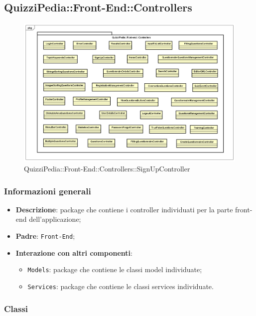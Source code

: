 \newpage
\subsection{QuizziPedia::Front-End::Controllers}


\begin{figure}
	\centering
	\includegraphics[scale=0.45]{UML/Package/QuizziPedia_Front-End_Controllers.png}
	\caption{QuizziPedia::Front-End::Controllers::SignUpController}
\end{figure}

\subsubsection{Informazioni generali}
\begin{itemize}
	\item \textbf{Descrizione}: package che contiene i controller individuati per la parte front-end dell'applicazione;
	\item \textbf{Padre}: \texttt{Front-End};
	\item \textbf{Interazione con altri componenti}:
	\begin{itemize}
		\item \texttt{Models}: package che contiene le classi model individuate;
		\item \texttt{Services}: package che contiene le classi services individuate.
	\end{itemize} 
\end{itemize}
\subsubsection{Classi}

